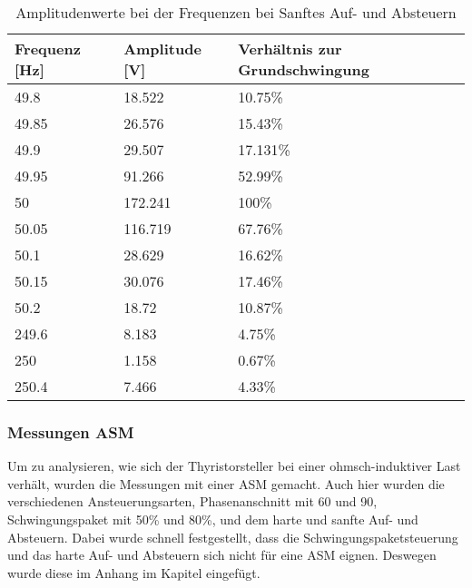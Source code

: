 \begin{table}[ht!]
	\centering
	\begin{tabular}{|l|l|l|}
		\hline
		Frequenz {[}Hz{]} & Amplitude {[}V{]} & Verhältnis zur Grundschwingung \\ \hline
		49.8              & 18.522            & 10.75\%                        \\ \hline
		49.85             & 26.576            & 15.43\%                        \\ \hline
		49.9              & 29.507            & 17.131\%                       \\ \hline
		49.95             & 91.266            & 52.99\%                        \\ \hline
		50                & 172.241           & 100\%                          \\ \hline
		50.05             & 116.719           & 67.76\%                        \\ \hline
		50.1              & 28.629            & 16.62\%                        \\ \hline
		50.15             & 30.076            & 17.46\%                        \\ \hline
		50.2              & 18.72             & 10.87\%                        \\ \hline
		249.6             & 8.183             & 4.75\%                         \\ \hline
		250               & 1.158             & 0.67\%                         \\ \hline
		250.4             & 7.466             & 4.33\%                         \\ \hline
	\end{tabular}
\caption{Amplitudenwerte bei der Frequenzen bei Sanftes Auf- und Absteuern}\label{tab:Mess_Spannung_AufAb_sanft}
\end{table}

\newpage
\subsubsection{Messungen ASM}
Um zu analysieren, wie sich der Thyristorsteller bei einer ohmsch-induktiver Last verhält, wurden die Messungen mit einer ASM gemacht. Auch hier wurden die verschiedenen Ansteuerungsarten, Phasenanschnitt mit 60\textdegree \hspace{0.02cm} und 90\textdegree \hspace{0.02cm}, Schwingungspaket mit 50\% und 80\%, und dem harte und sanfte Auf- und Absteuern. Dabei wurde schnell festgestellt, dass die Schwingungspaketsteuerung und das harte Auf- und Absteuern sich nicht für eine ASM eignen. 
Deswegen wurde diese im Anhang im Kapitel  eingefügt.

